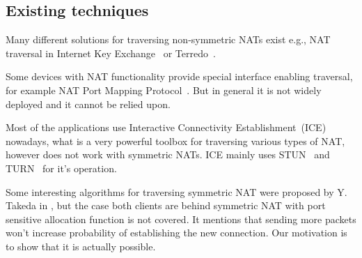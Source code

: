 \documentclass[twoside]{article}
\newcommand{\ignore}[1]{}
\begin{document}
\begin{multicols}{2}
% 
% 
% 


\section{Existing techniques}
Many different solutions for traversing non-symmetric NATs exist e.g., NAT traversal in Internet Key Exchange~\citep{rfc3947} or Terredo\ignore{tunneling}~\citep{rfc4380}.

Some devices with NAT functionality provide special interface enabling traversal, for example NAT Port Mapping Protocol~\citep{rfc6886}. But in general 
it is not widely deployed and it cannot be relied upon. 

Most of the applications use Interactive Connectivity Establishment~(ICE)~\citep{rfc5245} nowadays, what is a very powerful toolbox for traversing 
various types of NAT, however does not work with symmetric NATs. ICE mainly uses STUN~\citep{rfc5389} and TURN~\citep{rfc5766} for it's operation.

Some interesting algorithms for traversing symmetric NAT were proposed by Y. Takeda in \citep{takeda}, but the case both clients are behind symmetric NAT
with port sensitive allocation function is not covered. It mentions that sending more packets won't increase probability of establishing the new connection.
Our motivation is to show that it is actually possible.


\end{multicols}
\end{document}
